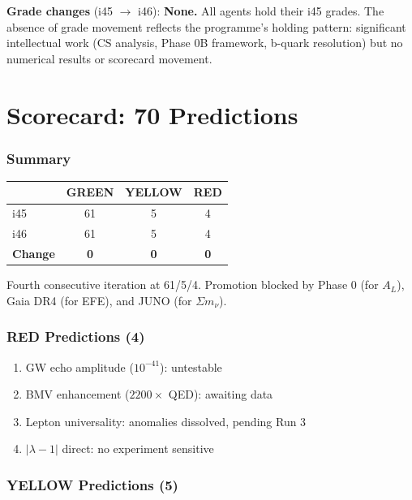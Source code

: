 \documentclass[11pt,a4paper]{article}
\newcommand{\GREEN}{\textcolor{dfdgreen}{\textbf{GREEN}}}
\newcommand{\YELLOW}{\textcolor{dfdyellow}{\textbf{YELLOW}}}
\newcommand{\RED}{\textcolor{dfdred}{\textbf{RED}}}
\begin{document}
\textbf{Grade changes} (i45 $\to$ i46): \textbf{None.} All agents hold their i45 grades. The absence of grade movement reflects the programme's holding pattern: significant intellectual work (CS analysis, Phase 0B framework, b-quark resolution) but no numerical results or scorecard movement.


\part{Scorecard: 70 Predictions}

\section{Summary}

\begin{center}
\begin{tabular}{lccc}
\toprule
& \textbf{\GREEN} & \textbf{\YELLOW} & \textbf{\RED} \\
\midrule
i45 & 61 & 5 & 4 \\
i46 & 61 & 5 & 4 \\
\textbf{Change} & \textbf{0} & \textbf{0} & \textbf{0} \\
\bottomrule
\end{tabular}
\end{center}

Fourth consecutive iteration at 61/5/4. Promotion blocked by Phase 0 (for $A_L$), Gaia DR4 (for EFE), and JUNO (for $\Sigma m_\nu$).

\section{RED Predictions (4)}

\begin{enumerate}
\item GW echo amplitude ($10^{-41}$): untestable
\item BMV enhancement ($2200\times$ QED): awaiting data
\item Lepton universality: anomalies dissolved, pending Run 3
\item $|\lambda-1|$ direct: no experiment sensitive
\end{enumerate}

\section{YELLOW Predictions (5)}
\end{document}
